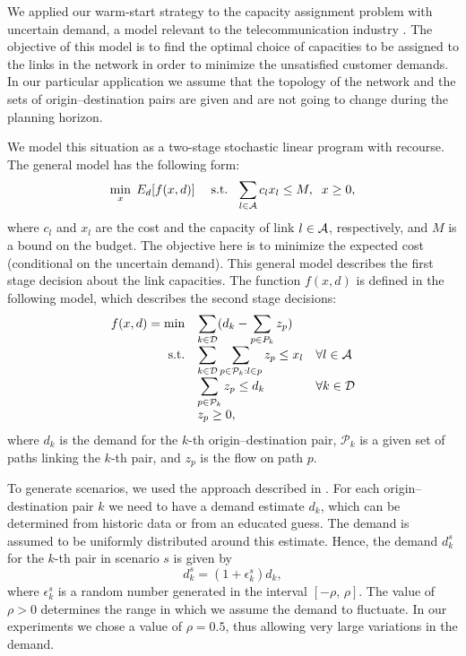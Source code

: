 We applied our warm-start strategy to the capacity assignment problem 
with uncertain demand, a model relevant to the telecommunication 
industry \cite{Ouorou}. The objective of this model is to find 
the optimal choice of capacities to be assigned to the links 
in the network in order to minimize the unsatisfied customer demands.
In our particular application we assume that the topology 
of the network and the sets of origin--destination pairs are given 
and are not going to change during the planning horizon.

We model this situation as a two-stage stochastic linear program 
with recourse. The general model has the following form:
\[
  \min_x \; E_d [f(x,d)] \;\quad 
  \mbox{s.t. }\; \sum_{l \in {\cal A}} c_l x_l \le M, \;\;  x \ge 0,
\]
where $c_l$ and $x_l$ are the cost and the capacity of link $l \in {\cal A}$, 
respectively, and $M$ is a bound on the budget. The objective 
here is to minimize the expected cost (conditional on the uncertain 
demand). This general model describes the first stage 
decision about the link capacities.
The function $f(x,d)$ is defined in the following model, which 
describes the second stage decisions:
\[
\begin{array}{rll}
  f(x,d) =\min & \displaystyle\sum_{k\in {\cal D}} (d_k -\sum_{p\in P_k} z_p)\\
  \mbox{s.t.}  & \displaystyle\sum_{k\in {\cal D}} \sum_{p\in {\cal P}_k: l\in p} z_p \le x_l
                                        & \forall l \in {\cal A} \\
               & \displaystyle\sum_{p\in {\cal P}_k} z_p \le d_k
                                        & \forall k \in {\cal D} \\
               & z_p \ge0,
\end{array}
\]
where $d_k$ is the demand for the $k$-th origin--destination pair, 
$\mathcal{P}_k$ is a given set of paths linking the $k$-th pair, and $z_p$ 
is the flow on path $p$.

To generate  scenarios, we used the approach described in \cite{Ouorou}. 
For each origin--destination pair $k$ we need to have a demand 
estimate $d_k$, which can be determined from historic data 
or from an educated guess. The demand is assumed to be uniformly 
distributed around this estimate. Hence, the demand $d_k^s$ 
for the $k$-th pair in scenario $s$ is given by
\[
d_k^s = (1+ \epsilon_k^s)d_k,
\]
where $\epsilon_k^s$ is a random number generated in the interval 
$[-\rho, \, \rho]$. The value of $\rho > 0$ determines the range 
in which we assume the demand to fluctuate.
In our experiments we chose a value of $\rho = 0.5$, thus allowing
very large variations in the demand.
%

